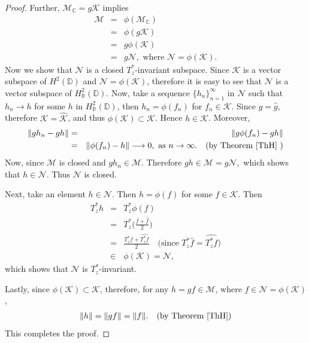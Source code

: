 \documentclass[11pt]{amsart}
\numberwithin{equation}{section}
\begin{document}
\begin{proof}
 Further, $\mathcal{M}_\mathbb{C}=g\mathcal{K}$ implies 
\begin{eqnarray*}
\mathcal{M}&=&\phi(\mathcal{M}_\mathbb{C})\\
&=&\phi(g\mathcal{K})\\&=&g\phi(\mathcal{K})\\&=&g\mathcal{N}, \text{ where } \mathcal{N}=\phi(\mathcal{K}).
\end{eqnarray*}
Now we show that $\mathcal{N}$ is a closed $T^*_z$-invariant subspace. Since $\mathcal{K}$ is a vector subspace of $H^2(\mathbb{D})$ and $\mathcal{N}=\phi(\mathcal{K})$, therefore it is easy to see that $\mathcal{N}$ is a vector subspace of $H^2_{\mathbb{R}}(\mathbb{D})$. Now, take a sequence $\{h_n\}_{n=1}^{\infty}$ in $\mathcal{N}$  such that $h_n \longrightarrow h$ for some $h$ in $H^2_{\mathbb{R}}(\mathbb{D})$, then $h_n=\phi(f_n)$ for $f_n \in \mathcal{K}$. Since $g=\widehat{g}$, therefore $\mathcal{K}=\widehat{\mathcal{K}}$, and thus $\phi(\mathcal{K}) \subset \mathcal{K}$. Hence $h \in \mathcal{K}$. Moreover,
\begin{eqnarray*}
\|gh_n-gh\|&=&\|g\phi(f_n)-gh\|\\ &=&\|\phi(f_n)-h\|\longrightarrow 0, \text{ as }n \rightarrow \infty. \quad \text{(by Theorem \ref{ThH} )}    
\end{eqnarray*}
Now, since $\mathcal{M}$ is closed and $gh_n\in \mathcal{M}$. Therefore $gh \in \mathcal{M}=g\mathcal{N},$
which shows that $h \in \mathcal{N}$. Thus $\mathcal{N}$ is closed.


 Next, take an element $h\in \mathcal{N}$. Then $h=\phi(f)$ for some $f\in \mathcal{K}$. Then
\begin{eqnarray*}
T^*_zh&=&
T^*_z\phi(f)\\&=&T^*_z\bigg(\frac{f + \widehat{f}}{2}\bigg)\\
&=&\frac{T^*_zf + \widehat{T^*_zf}}{2} \quad \text{(since $T^*_z\widehat{f}=\widehat{T^*_zf})$}\\
&\in &  \phi(\mathcal{K})=\mathcal{N},    
\end{eqnarray*}
which shows that $\mathcal{N}$ is $T^*_z$-invariant.


 Lastly, since $\phi(\mathcal{K})\subset \mathcal{K}$, therefore, for any $h=gf\in \mathcal{M}$, where $f \in \mathcal{N}= \phi(\mathcal{K})$,
\begin{eqnarray*}
\|h\|=\|gf\|=\|f\|. &&\text{(by Theorem \ref{ThH})}  
\end{eqnarray*}
This completes the proof.   
\end{proof}
\end{document}
